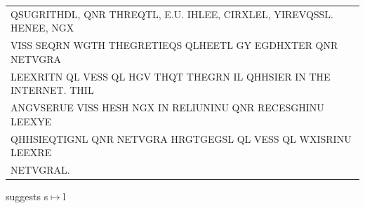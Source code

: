 \documentclass[aspectratio=169, lualatex, handout, 10pt,dvipsnames,svgnames]{beamer} %
\def\enbleu#1{\textcolor{bleu}{#1}}
\begin{document}
\begin{frame}
{\begin{tabular}[t]{l}
      QSUG\enbleu{R}\enbleu{I}\enbleu{T}\enbleu{H}DL, Q\enbleu{N}R \enbleu{T}\enbleu{H}\enbleu{R}\enbleu{E}Q\enbleu{T}L, \enbleu{E}.U. \enbleu{I}HL\enbleu{E}E, C\enbleu{I}\enbleu{R}XL\enbleu{E}L, Y\enbleu{I}\enbleu{R}\enbleu{E}VQSSL. \enbleu{H}\enbleu{E}\enbleu{N}E\enbleu{E}, NGX \\
      V\enbleu{I}SS S\enbleu{E}Q\enbleu{R}\enbleu{N} WG\enbleu{T}\enbleu{H} \enbleu{T}\enbleu{H}\enbleu{E}G\enbleu{R}\enbleu{E}\enbleu{T}\enbleu{I}EQS QLH\enbleu{E}E\enbleu{T}L GY EGDHX\enbleu{T}\enbleu{E}\enbleu{R} Q\enbleu{N}R \enbleu{N}\enbleu{E}\enbleu{T}VG\enbleu{R}A \\
      L\enbleu{E}EX\enbleu{R}\enbleu{I}\enbleu{T}N QL V\enbleu{E}SS QL \enbleu{H}GV \enbleu{T}\enbleu{H}Q\enbleu{T} \enbleu{T}\enbleu{H}\enbleu{E}G\enbleu{R}N \enbleu{I}L QHHS\enbleu{I}\enbleu{E}R \enbleu{I}\enbleu{N} \enbleu{T}\enbleu{H}\enbleu{E} \enbleu{I}\enbleu{N}\enbleu{T}\enbleu{E}\enbleu{R}\enbleu{N}\enbleu{E}\enbleu{T}. \enbleu{T}\enbleu{H}\enbleu{I}L \\
      A\enbleu{N}GVS\enbleu{E}RU\enbleu{E} V\enbleu{I}SS \enbleu{H}\enbleu{E}SH NGX \enbleu{I}\enbleu{N} R\enbleu{E}L\enbleu{I}U\enbleu{N}\enbleu{I}\enbleu{N}U Q\enbleu{N}R R\enbleu{E}C\enbleu{E}SGH\enbleu{I}\enbleu{N}U L\enbleu{E}EXY\enbleu{E} \\
      QHHS\enbleu{I}EQ\enbleu{T}\enbleu{I}G\enbleu{N}L Q\enbleu{N}R \enbleu{N}\enbleu{E}\enbleu{T}VG\enbleu{R}A H\enbleu{R}G\enbleu{T}GEGSL QL V\enbleu{E}SS QL WX\enbleu{I}SR\enbleu{I}\enbleu{N}U L\enbleu{E}EX\enbleu{R}\enbleu{E} \\
      \enbleu{N}\enbleu{E}\enbleu{T}VG\enbleu{R}AL.
    \end{tabular}
  }
  \vspace{0.5cm}

  \normalsize
  \color{black}{The first word is THIL}
  \pause
  
  {suggests s$\mapsto$l}
  \color{black}
\end{frame}
\end{document}
